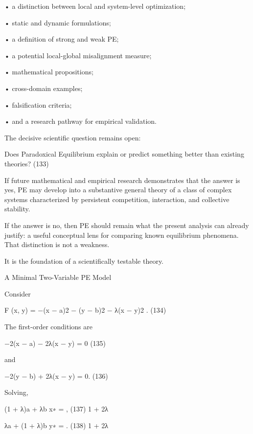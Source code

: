\documentclass[10pt,a4paper]{article}
\begin{document}
\begin{ManuscriptText}
  • a distinction between local and system-level optimization;

  • static and dynamic formulations;

  • a definition of strong and weak PE;

  • a potential local-global misalignment measure;

  • mathematical propositions;

  • cross-domain examples;

  • falsification criteria;

  • and a research pathway for empirical validation.

The decisive scientific question remains open:


  Does Paradoxical Equilibrium explain or predict something better than existing theories?
                                                                                             (133)


If future mathematical and empirical research demonstrates that the answer is yes, PE may
develop into a substantive general theory of a class of complex systems characterized by persistent
competition, interaction, and collective stability.

If the answer is no, then PE should remain what the present analysis can already justify: a
useful conceptual lens for comparing known equilibrium phenomena.
That distinction is not a weakness.

It is the foundation of a scientifically testable theory.


A      Minimal Two-Variable PE Model

Consider


                           F (x, y) = −(x − a)2 − (y − b)2 − λ(x − y)2 .                     (134)

The first-order conditions are


                                    −2(x − a) − 2λ(x − y) = 0                                (135)

and


                                    −2(y − b) + 2λ(x − y) = 0.                               (136)

Solving,

                                                 (1 + λ)a + λb
                                        x∗ =                   ,                             (137)
                                                     1 + 2λ

                                                 λa + (1 + λ)b
                                        y∗ =                   .                             (138)
                                                    1 + 2λ


\end{ManuscriptText}
\end{document}
